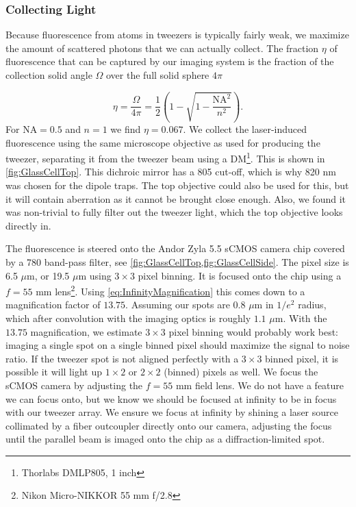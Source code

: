 \subsubsection*{Collecting Light}

Because fluorescence from atoms in tweezers is typically fairly weak, we maximize the amount of scattered photons that we can actually collect. 
The fraction $\eta$ of fluorescence that can be captured by our imaging system is the fraction of the collection solid angle $\Omega$ over the full solid sphere $4\pi$

\begin{equation}\label{eq:Collection}
    \eta = \frac{\Omega}{4\pi} = 
    \frac{1}{2}\left(1-\sqrt{1-\frac{\text{NA}^2}{n^2}}\right).
\end{equation}
For $\text{NA}=0.5$ and $n=1$ we find $\eta =0.067$. 
We collect the laser-induced fluorescence using the same microscope objective as used for producing the tweezer, separating it from the tweezer beam using a \ac{DM}\footnote{Thorlabs DMLP805, 1 inch}.
This is shown in \cref{fig:GlassCellTop}.
This dichroic mirror has a 805 cut-off, which is why 820 nm was chosen for the dipole traps.
The top objective could also be used for this, but it will contain aberration as it cannot be brought close enough. 
Also, we found it was non-trivial to fully filter out the tweezer light, which the top objective looks directly in.

The fluorescence is steered onto the Andor Zyla 5.5 sCMOS camera chip covered by a 780 band-pass filter, see \cref{fig:GlassCellTop,fig:GlassCellSide}.
The pixel size is 6.5 $\mu$m, or 19.5 $\mu$m using $3\times3$ pixel binning. 
It is focused onto the chip using a $f= 55$ mm lens\footnote{Nikon Micro-NIKKOR 55 mm f/2.8}.
Using \cref{eq:InfinityMagnification} this comes down to a magnification factor of $13.75$.
Assuming our spots are $0.8$ $\mu$m in $1/e^2$ radius, which after convolution with the imaging optics is roughly $1.1$ $\mu$m.
With the $13.75$ magnification, we estimate $3\times3$ pixel binning would probably work best: imaging a single spot on a single binned pixel should maximize the signal to noise ratio. 
If the tweezer spot is not aligned perfectly with a $3\times3$ binned pixel, it is possible it will light up $1\times2$ or $2\times2$ (binned) pixels as well.
We focus the sCMOS camera by adjusting the $f=55$ mm field lens.
We do not have a feature we can focus onto, but we know we should be focused at infinity to be in focus with our tweezer array. 
We ensure we focus at infinity by shining a laser source collimated by a fiber outcoupler directly onto our camera, adjusting the focus until the parallel beam is imaged onto the chip as a diffraction-limited spot. 

